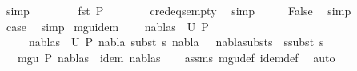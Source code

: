 \begin{isabellebody}
\ simp\isanewline
\ \ \isamarkupfalse%
\ \isamarkupfalse%
\ {}{\isacharparenleft}{\kern0pt}{}{\isacharparenright}{\kern0pt}\ \isamarkupfalse%
\ {\isachardoublequoteopen}fst\ P{}\ {\isacharequal}{\kern0pt}\ {\isacharbrackleft}{\kern0pt}{\isacharbrackright}{\kern0pt}{\isachardoublequoteclose}\isanewline
\ \ \ \ \isamarkupfalse%
\ c{\isacharunderscore}{\kern0pt}red{\isacharunderscore}{\kern0pt}eqs{\isacharunderscore}{\kern0pt}empty\ \isamarkupfalse%
\ simp\isanewline
\ \ \isamarkupfalse%
\ \isamarkupfalse%
\ False\ \isamarkupfalse%
\ simp\isanewline
\ \ \isamarkupfalse%
\ \isamarkupfalse%
\ {\isacharquery}{\kern0pt}case\ \isamarkupfalse%
\ simp\isanewline
{}\isamarkupfalse%
%
\endisatagproof
{\isafoldproof}%
%
\isadelimproof
\isanewline
%
\endisadelimproof
\isanewline
\isanewline
{}\isamarkupfalse%
\ mgu{\isacharunderscore}{\kern0pt}idem{\isacharcolon}{\kern0pt}\ \isanewline
\ \ \ {\isachardoublequoteopen}{\isacharparenleft}{\kern0pt}nabla{}{\isacharcomma}{\kern0pt}s{}{\isacharparenright}{\kern0pt}\ {\isasymin}\ U\ P{\isachardoublequoteclose}\isanewline
\ \ \ \ \ {\isachardoublequoteopen}{\isasymforall}{\isacharparenleft}{\kern0pt}nabla{}{\isacharcomma}{\kern0pt}s{}{\isacharparenright}{\kern0pt}\ {\isasymin}\ U\ P{\isachardot}{\kern0pt}\ nabla{}\ {\isasymTurnstile}{\isacharparenleft}{\kern0pt}subst\ s{}{\isacharparenright}{\kern0pt}\ nabla{}\ {\isasymand}\ \ nabla{}{\isasymTurnstile}subst{\isacharparenleft}{\kern0pt}s{}\ {\isasymbullet}\ s{}{\isacharparenright}{\kern0pt}{\isasymapprox}subst\ s{}{\isachardoublequoteclose}\isanewline
\ \ \ {\isachardoublequoteopen}mgu\ P\ {\isacharparenleft}{\kern0pt}nabla{}{\isacharcomma}{\kern0pt}s{}{\isacharparenright}{\kern0pt}\ {\isasymand}\ idem\ {\isacharparenleft}{\kern0pt}nabla{}{\isacharcomma}{\kern0pt}s{}{\isacharparenright}{\kern0pt}{\isachardoublequoteclose}\isanewline
%
\isadelimproof
\ \ %
\endisadelimproof
%
\isatagproof
{}\isamarkupfalse%
\ assms\ mgu{\isacharunderscore}{\kern0pt}def\ idem{\isacharunderscore}{\kern0pt}def\ \isamarkupfalse%
\ auto%

\end{isabellebody}
